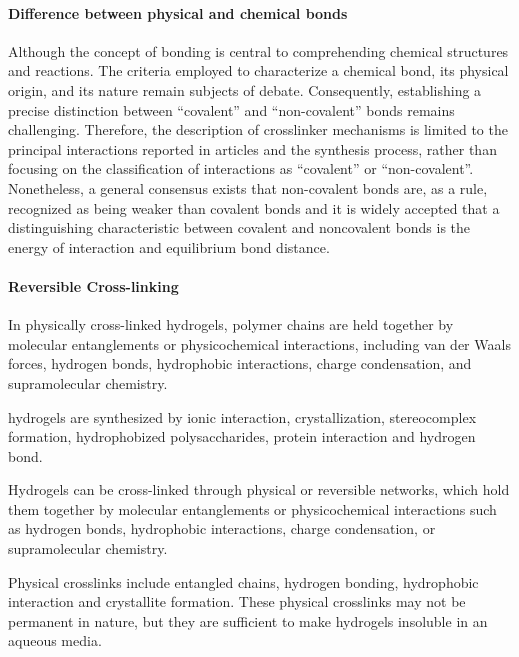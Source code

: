 \paragraph{Difference between physical and chemical bonds}
Although the concept of bonding is central to comprehending chemical structures and reactions.
The criteria employed to characterize a chemical bond, its physical origin, and its nature remain subjects of debate\citep{kumarDevelopingCriterionCharacterize2021}.
Consequently, establishing a precise distinction between ``covalent'' and ``non-covalent'' bonds remains challenging.
Therefore, the description of crosslinker mechanisms is limited to the principal interactions reported in articles and the synthesis process, rather than focusing on the classification of interactions as ``covalent'' or ``non-covalent''.
Nonetheless, a general consensus exists that non-covalent bonds are, as a rule, recognized as being weaker than covalent bonds and it is widely accepted that a distinguishing characteristic between covalent and noncovalent bonds is the energy of interaction and equilibrium bond distance\citep{kumarDevelopingCriterionCharacterize2021}.


\paragraph{Reversible Cross-linking}
In physically cross-linked hydrogels, polymer chains are held together by molecular entanglements or physicochemical interactions, including van der Waals forces, hydrogen bonds, hydrophobic interactions, charge condensation, and supramolecular chemistry\citep{bustamante-torresHydrogelsClassificationAccording2021}.

\citep{maitraCrosslinkingHydrogelsReview2014}
hydrogels are synthesized by ionic interaction, crystallization, stereocomplex formation, hydrophobized polysaccharides, protein interaction and hydrogen bond.

\citep{bustamante-torresHydrogelsClassificationAccording2021}
Hydrogels can be cross-linked through physical or reversible networks, which hold them together by molecular entanglements or physicochemical interactions such as hydrogen bonds, hydrophobic interactions, charge condensation, or supramolecular chemistry.



Physical crosslinks include entangled chains, hydrogen bonding, hydrophobic interaction and crystallite formation. 
These physical crosslinks may not be permanent in nature, but they are sufficient to make hydrogels insoluble in an aqueous media.



